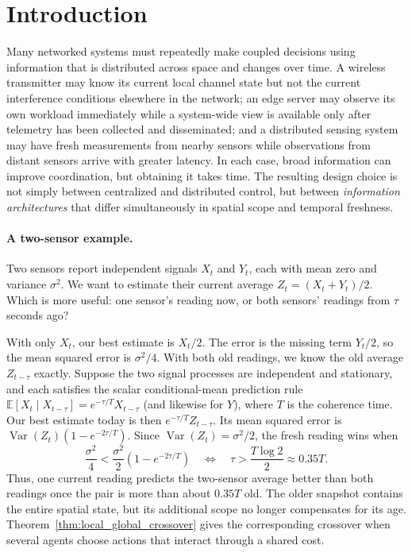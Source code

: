 \documentclass[11pt]{article}
\begin{document}
\section{Introduction}
\label{sec:introduction}

Many networked systems must repeatedly make coupled decisions using information
that is distributed across space and changes over time. A wireless transmitter
may know its current local channel state but not the current interference
conditions elsewhere in the network; an edge server may observe its own
workload immediately while a system-wide view is available only after telemetry
has been collected and disseminated; and a distributed sensing system may have
fresh measurements from nearby sensors while observations from distant sensors
arrive with greater latency. In each case, broad information can improve
coordination, but obtaining it takes time. The resulting design choice is not
simply between centralized and distributed control, but between
\emph{information architectures} that differ simultaneously in spatial scope
and temporal freshness.

\paragraph*{A two-sensor example.}
Two sensors report independent signals $X_t$ and $Y_t$, each with mean zero
and variance $\sigma^2$. We want to estimate their current average
$Z_t=(X_t+Y_t)/2$. Which is more useful: one sensor's reading now, or both
sensors' readings from $\tau$ seconds ago?

With only $X_t$, our best estimate is $X_t/2$. The error is the missing term
$Y_t/2$, so the mean squared error is $\sigma^2/4$. With both old readings,
we know the old average $Z_{t-\tau}$ exactly. Suppose the two signal processes are independent and stationary, and each
satisfies the scalar conditional-mean prediction rule
$\mathbb E[X_t\mid X_{t-\tau}]=e^{-\tau/T}X_{t-\tau}$ (and likewise
for $Y$), where $T$ is the coherence time. Our best estimate today is then $e^{-\tau/T}Z_{t-\tau}$.
Its mean squared error is
$\operatorname{Var}(Z_t)(1-e^{-2\tau/T})$. Since
$\operatorname{Var}(Z_t)=\sigma^2/2$, the fresh reading wins when
\[
    \frac{\sigma^2}{4}
    <\frac{\sigma^2}{2}(1-e^{-2\tau/T})
    \quad\Longleftrightarrow\quad
    \tau>\frac{T\log 2}{2}\approx 0.35T.
\]
Thus, one current reading predicts the two-sensor average better than both
readings once the pair is more than about $0.35T$ old. The older snapshot
contains the entire spatial state, but its additional scope no longer
compensates for its age. Theorem~\ref{thm:local_global_crossover} gives the
corresponding crossover when several agents choose actions that interact
through a shared cost.
\end{document}

